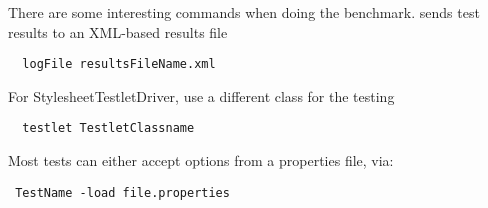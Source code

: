 There are some interesting commands when doing the benchmark. 
sends test results to an XML-based results file
\begin{lstlisting}
  logFile resultsFileName.xml
\end{lstlisting}  

For StylesheetTestletDriver, use a different class for the testing 
\begin{lstlisting}
  testlet TestletClassname
\end{lstlisting}

Most tests can either accept options from a properties file, via:
\begin{lstlisting}
 TestName -load file.properties
\end{lstlisting}
